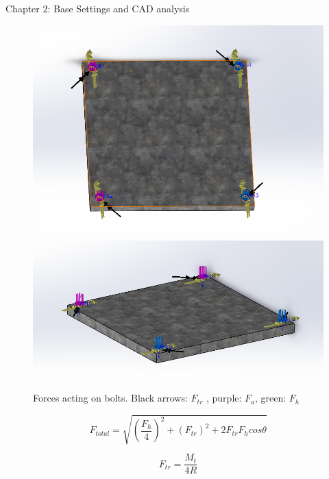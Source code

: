 \documentclass{book}
\begin{document}
\begin{chapter}{Chapter 2: Base Settings and CAD analysis}
\begin{figure}[H]
	\begin{minipage}{0.5\textwidth}	
		\includegraphics[scale=0.35]{CombinedForces1}
	\end{minipage} \hfill
	\begin{minipage}{0.6\textwidth}
		\includegraphics[scale=0.5]{CombinedForces2}
	\end{minipage}
	\begin{center}
		\caption{Forces acting on bolts. Black arrows: $F_{tr}$ , purple: $F_{a}$, green: $F_{h}$ }
	\end{center}
\end{figure}

\begin{equation}
F_{total} = \sqrt{(\frac{F_{h}}{4})^{2} + (F_{tr})^{2} + 2 F_{tr} F_{h} cos \theta}
\end{equation}

\begin{equation}
F_{tr} = \frac{M_{t}}{4 R}
\end{equation}


\end{chapter}
\end{document}
